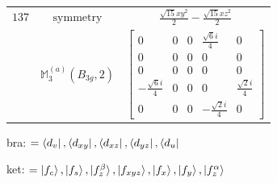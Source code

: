 \documentclass[fleqn,8pt,landscape]{jsarticle}
\begin{document}
\begin{longtable}{ccc}
$ 137 $ & $ \text{symmetry} $ & $ \frac{\sqrt{15} x y^{2}}{2} - \frac{\sqrt{15} x z^{2}}{2} $ \\
$  $ & $ \mathbb{M}_{3}^{(a)}(B_{3g},2) $ & $ \begin{bmatrix} 0 & 0 & 0 & \frac{\sqrt{6} i}{4} & 0 \\ 0 & 0 & 0 & 0 & 0 \\ 0 & 0 & 0 & 0 & 0 \\ - \frac{\sqrt{6} i}{4} & 0 & 0 & 0 & \frac{\sqrt{2} i}{4} \\ 0 & 0 & 0 & - \frac{\sqrt{2} i}{4} & 0 \end{bmatrix} $ \\ \hline
\end{longtable}
bra: $=\bra{d_{v}}, \bra{d_{xy}}, \bra{d_{xz}}, \bra{d_{yz}}, \bra{d_{u}}$

\noindent
ket: $=\ket{f_{c}}, \ket{f_{s}}, \ket{f_{z}^{\beta}}, \ket{f_{xyz}}, \ket{f_{x}}, \ket{f_{y}}, \ket{f_{z}^{\alpha}}$
\renewcommand{\arraystretch}{1.6}
\end{document}
